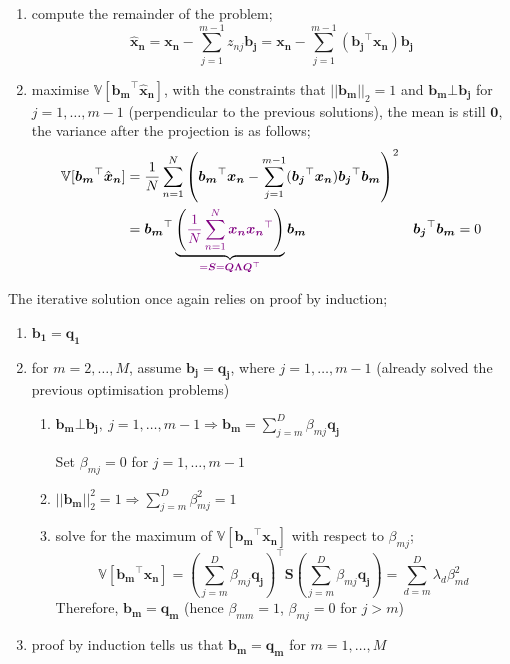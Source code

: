 \documentclass[a4paper, 12pt]{article}
\newcommand{\summation}[2]{\sum\limits_{#1}^{#2}}
\newcommand{\mat}[1]{\boldsymbol{#1}}
\newcommand{\violet}[1]{\textcolor{violet}{#1}}
\begin{document}
            \begin{enumerate}
                \itemsep0em
                \item compute the remainder of the problem;
                    $$\hat{\mat{x}}_{\mat{n}} = \mat{x_n} - \summation{j = 1}{m - 1} z_{nj} \mat{b_j} = \mat{x_n} - \summation{j = 1}{m - 1} (\mat{b_j}^\top \mat{x_n}) \mat{b_j}$$
                \item maximise $\mathbb{V}[\mat{b_m}^\top \hat{\mat{x}}_{\mat{n}}]$, with the constraints that $|| \mat{b_m} ||_2 = 1$ and $\mat{b_m} \bot \mat{b_j}$ for $j = 1, \dots, m - 1$ (perpendicular to the previous solutions), the mean is still $\mat{0}$, the variance after the projection is as follows;
                    \begin{align*}
                        \mathbb{V}[\mat{b_m}^\top \hat{\mat{x}}_{\mat{n}}] & = \frac{1}{N} \summation{n = 1}{N} \left(\mat{b_m}^\top\mat{x_n} - \summation{j = 1}{m - 1} (\mat{b_j}^\top\mat{x_n}) \mat{b_j}^\top\mat{b_m} \right)^2 \\
                        & = \mat{b_m}^\top \underbrace{\left( \violet{\frac{1}{N} \summation{n = 1}{N} \mat{x_n}\mat{x_n}^\top} \right)}_{\violet{= \mat{S} = \mat{Q}\mat{\Lambda}\mat{Q}^\top}} \mat{b_m} & \mat{b_j}^\top\mat{b_m} = 0 \\
                    \end{align*}
            \end{enumerate}
            The iterative solution once again relies on proof by induction;
            \begin{enumerate}
                \itemsep0em
                \item $\mat{b_1} = \mat{q_1}$
                \item for $m = 2, \dots, M$, assume $\mat{b_j} = \mat{q_j}$, where $j = 1, \dots, m - 1$ (already solved the previous optimisation problems)
                    \begin{enumerate}
                        \itemsep0em
                        \item $\mat{b_m} \bot \mat{b_j},\ j = 1, \dots, m - 1 \Rightarrow \mat{b_m} = \summation{j = m}{D} \beta_{mj}\mat{q_j}$
                            \smallskip

                            Set $\beta_{mj} = 0$ for $j = 1, \dots, m - 1$
                        \item $|| \mat{b_m} ||_2^2 = 1 \Rightarrow \summation{j = m}{D} \beta_{mj}^2 = 1$
                        \item solve for the maximum of $\mathbb{V}[\mat{b_m}^\top\mat{x_n}]$ with respect to $\beta_{mj}$;
                            $$\mathbb{V}[\mat{b_m}^\top\mat{x_n}] = \left(\summation{j = m}{D} \beta_{mj}\mat{q_j}\right)^\top\mat{S}\left(\summation{j = m}{D} \beta_{mj}\mat{q_j}\right) = \summation{d = m}{D} \lambda_d \beta_{md}^2$$
                            Therefore, $\mat{b_m} = \mat{q_m}$ (hence $\beta_{mm} = 1$, $\beta_{mj} = 0$ for $j > m$)
                    \end{enumerate}
                \item proof by induction tells us that $\mat{b_m} = \mat{q_m}$ for $m = 1, \dots, M$
            \end{enumerate}
\end{document}
